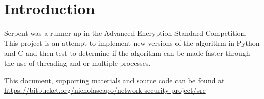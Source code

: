 \section{Introduction}

Serpent was a runner up in the Advanced Encryption Standard Competition. This project is an attempt to implement new versions of the algorithm in Python and C and then test to determine if the algorithm can be made faster through the use of threading and or multiple processes.

This document, supporting materials and source code can be found at \url{https://bitbucket.org/nicholascapo/network-security-project/src}